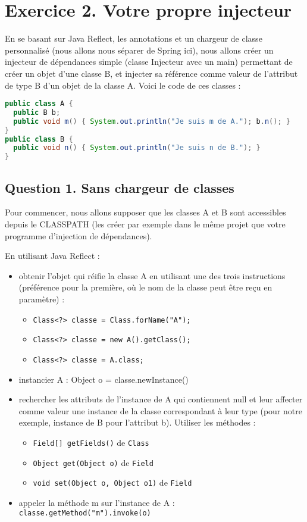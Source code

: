 \documentclass[11pt]{article}
\begin{document}
\section*{Exercice 2. \small{Votre propre injecteur}} 

En se basant sur Java Reflect, les annotations et un chargeur de
classe personnalisé (nous allons nous séparer de Spring ici), nous
allons créer un injecteur de dépendances simple (classe Injecteur avec
un main) permettant de créer un objet d'une classe B, et injecter sa
référence comme valeur de l'attribut de type B d'un objet de la classe
A.  Voici le code de ces classes :

\begin{lstlisting}[language=Java,basicstyle=\scriptsize]
public class A {
  public B b;
  public void m() { System.out.println("Je suis m de A."); b.n(); }
}
public class B {
  public void n() { System.out.println("Je suis n de B."); }
}  
\end{lstlisting}

\subsection*{Question 1. \small{Sans chargeur de classes}}
Pour commencer, nous allons supposer que les classes A et B sont
accessibles depuis le CLASSPATH (les créer par exemple dans le même
projet que votre programme d'injection de dépendances).

En utilisant Java Reflect :
\begin{itemize}
\item obtenir l'objet qui réifie la classe A en utilisant une des
  trois instructions (préférence pour la première, où le nom de la
  classe peut être reçu en paramètre) :
  \begin{itemize}
  \item \texttt{Class<?> classe = Class.forName("A"); }
  \item \texttt{Class<?> classe = new A().getClass();}
  \item \texttt{Class<?> classe = A.class;}
  \end{itemize}
\item instancier A : Object o = classe.newInstance()
\item rechercher les attributs de l'instance de A qui contiennent null et leur affecter comme valeur une instance de la classe correspondant à leur type (pour notre exemple, instance de B pour l'attribut b). Utiliser les méthodes :
  \begin{itemize}
  \item \texttt{Field[] getFields()} de \texttt{Class}
  \item \texttt{Object get(Object o)} de \texttt{Field}
  \item \texttt{void set(Object o, Object o1)} de \texttt{Field}
  \end{itemize}
\item appeler la méthode m sur l'instance de A :
  \texttt{classe.getMethod("m").invoke(o)}
  
\end{itemize}
\end{document}
